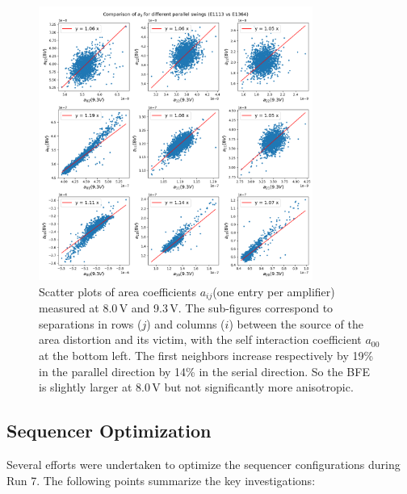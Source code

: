 \begin{figure}
\begin{centering}
\includegraphics[width=0.8\textwidth]{sections/figures/aScatterPlots8vs9-3.png}
\end{centering}
\caption{Scatter plots of area coefficients $a_{ij}$(one entry per amplifier)
measured at 8.0\,V and 9.3\,V. The sub-figures correspond to separations in rows ($j$) and columns ($i$)
between the source of the area distortion and its victim, with the self
interaction coefficient $a_{00}$ at the bottom left. The first neighbors increase
respectively by 19\% in the parallel direction by 14\% in the serial
direction. So the BFE is slightly larger at 8.0\,V but not significantly
more anisotropic.}
\label{fig:area-coeffs}
\end{figure}


\subsection{Sequencer Optimization}\label{sequencer-optimization}



Several efforts were undertaken to optimize the sequencer configurations during Run 7. The following points summarize the key investigations:

